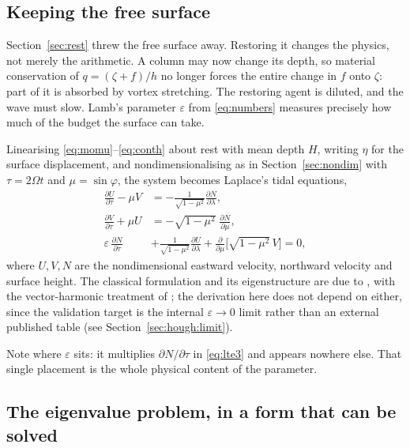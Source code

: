 \documentclass[11pt,a4paper]{article}
\begin{document}
\subsection{Keeping the free surface}

Section~\ref{sec:rest} threw the free surface away. Restoring it changes the
physics, not merely the arithmetic. A column may now change its depth, so
material conservation of $q = (\zeta+f)/h$ no longer forces the entire change in
$f$ onto $\zeta$: part of it is absorbed by vortex stretching. The restoring
agent is diluted, and the wave must slow. Lamb's parameter $\varepsilon$ from
\eqref{eq:numbers} measures precisely how much of the budget the surface can
take.

Linearising \eqref{eq:momu}--\eqref{eq:conth} about rest with mean depth $H$,
writing $\eta$ for the surface displacement, and nondimensionalising as in
Section~\ref{sec:nondim} with $\tau = 2\Omega t$ and $\mu = \sin\varphi$, the
system becomes Laplace's tidal equations,
%
\begin{align}
\frac{\partial U}{\partial \tau} - \mu V
  &= -\frac{1}{\sqrt{1-\mu^2}}\frac{\partial N}{\partial\lambda} ,
\label{eq:lte1}\\
\frac{\partial V}{\partial \tau} + \mu U
  &= -\sqrt{1-\mu^2}\;\frac{\partial N}{\partial\mu} ,
\label{eq:lte2}\\
\varepsilon\,\frac{\partial N}{\partial \tau}
  &+ \frac{1}{\sqrt{1-\mu^2}}\frac{\partial U}{\partial\lambda}
   + \frac{\partial}{\partial\mu}\Big[\sqrt{1-\mu^2}\,V\Big] = 0 ,
\label{eq:lte3}
\end{align}
%
where $U, V, N$ are the nondimensional eastward velocity, northward velocity and
surface height. The classical formulation and its eigenstructure are due to
\citet{longuethiggins1968}, with the vector-harmonic treatment of
\citet{swarztrauber1985}; the derivation here does not depend on either, since
the validation target is the internal $\varepsilon\to0$ limit rather than an
external published table (see Section~\ref{sec:hough:limit}).

Note where $\varepsilon$ sits: it multiplies $\partial N/\partial\tau$ in
\eqref{eq:lte3} and appears nowhere else. That single placement is the whole
physical content of the parameter.

\subsection{The eigenvalue problem, in a form that can be solved}
\end{document}
